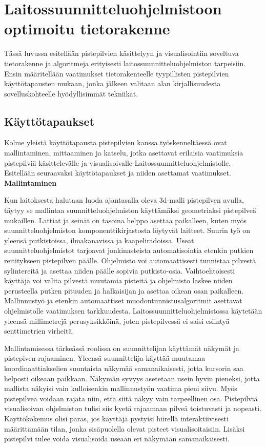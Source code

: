\section{Laitossuunnitteluohjelmistoon optimoitu tietorakenne}

Tässä luvussa esitellään pistepilvien käsittelyyn ja visualisointiin soveltuva tietorakenne ja algoritmeja erityisesti laitossuunnitteluohjelmiston tarpeisiin. Ensin määritellään vaatimukset tietorakenteelle tyypillisten pistepilvien käyttötapausten mukaan, jonka jälkeen valitaan alan kirjallisuudesta sovelluskohteelle hyödyllisimmät tekniikat.

\subsection{Käyttötapaukset}

Kolme yleistä käyttötapausta pistepilvien kanssa työskenneltäessä ovat mallintaminen, mittaaminen ja katselu, jotka asettavat erilaisia vaatimuksia pistepilviä käsittelevälle ja visualisoivalle Laitossuunnitteluohjelmistolle. Esitellään seuraavaksi käyttötapaukset ja niiden asettamat vaatimukset.\\ 

\large\textbf{Mallintaminen}
\normalsize

\noindent Kun laitoksesta halutaan luoda ajantasalla oleva 3d-malli pistepilven avulla, täytyy se mallintaa suunnitteluohjelmiston käyttämäksi geometriaksi pistepilveä mukaillen. Lattiat ja seinät on tasoina helppo asettaa paikalleen, kuten myös suunnitteluohjelmiston komponenttikirjastosta löytyvät laitteet. Suurin työ on yleensä putkistoissa, ilmakanavissa ja kaapeliradoissa. Useat suunnitteluohjelmistot tarjoavat jonkinasteista automatisointia etenkin putkien reititykseen pistepilven päälle. Ohjelmisto voi automaattisesti tunnistaa pilvestä sylintereitä ja asettaa niiden päälle sopivia putkisto-osia. Vaihtoehtoisesti käyttäjä voi valita pilvestä muutamia pisteitä ja ohjelmisto laskee niiden perusteella putken pituuden ja halkaisijan ja asettaa oikean osan paikalleen. Mallinnustyö ja etenkin automaattiset muodontunnistusalgoritmit asettavat ohjelmistolle vaatimuksen tarkkuudesta. Laitossuunnitteluohjelmistossa käytetään yleensä millimetrejä perusyksikköinä, joten pistepilvessä ei saisi esiintyä senttimetrien virheitä.

Mallintamisessa tärkeässä roolissa on suunnittelijan käyttämät näkymät ja pistepiven rajaaminen. Yleensä suunnittelija käyttää muutamaa koordinaattiakselien suuntaista näkymää samanaikaisesti, jotta kursorin saa helposti oikeaan paikkaan. Näkymän syvyys asetetaan usein hyvin pieneksi, jotta mallista näkyisi vain kulloisenkin mallinnustyön vaatima pieni siivu. Myös pistepilveä voidaan rajata niin, että siitä näkyy vain tarpeellinen osa. Pistepilviä visualisoivan ohjelmiston tulisi siis kyetä rajaamaan pilveä toistuvasti ja nopeasti. Käyttökokemus olisi paras, jos käyttäjä pystyisi hiirellä interaktiivisesti määrittämään tilan, jonka sisäpuolella olevat pisteet visualisoitaisiin. Lisäksi pistepilvi tulee voida visualisoida useaan eri näkymään samanaikaisesti.\\

